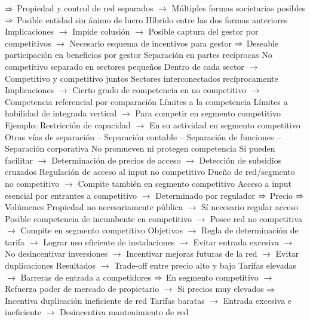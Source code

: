 \documentclass{nuevotema}
\begin{document}
\begin{esquemal}
				\4[] $\Rightarrow$ Propiedad y control de red separados
				\4[] $\to$ Múltiples formas societarias posibles
				\4[] $\Rightarrow$ Posible entidad sin ánimo de lucro
				\4[] Híbrido entre las dos formas anteriores
				\4[] Implicaciones
				\4[] $\to$ Impide colusión
				\4[] $\to$ Posible captura del gestor por competitivos
				\4[] $\to$ Necesario esquema de incentivos para gestor
				\4[] $\Rightarrow$ Deseable participación en beneficios por gestor
				\4 Separación en partes recíprocas
				\4[] No competitivo separado en sectores pequeños
				\4[] Dentro de cada sector
				\4[] $\to$ Competitivo y competitivo juntos
				\4[] Sectores interconectados recíprocamente
				\4[] Implicaciones
				\4[] $\to$ Cierto grado de competencia en no competitivo
				\4[] $\to$ Competencia referencial por comparación
				\4 Límites a la competencia
				\4[] Límites a habilidad de integrada vertical
				\4[] $\to$ Para competir en segmento competitivo
				\4 Ejemplo:
				\4[] Restricción de capacidad
				\4[] $\to$ En su actividad en segmento competitivo
				\4 Otras vías de separación
				\4[] -- Separación contable
				\4[] -- Separación de funciones
				\4[] -- Separación corporativa
				\4[] No promueven ni protegen competencia
				\4[] Sí pueden facilitar
				\4[] $\to$ Determinación de precios de acceso
				\4[] $\to$ Detección de subsidios cruzados
			\3 Regulación de acceso al input no competitivo
				\4 Dueño de red/segmento no competitivo
				\4[] $\to$ Compite también en segmento competitivo
				\4 Acceso a input esencial por entrantes a competitivo
				\4[] $\to$ Determinado por regulador
				\4[] $\Rightarrow$ Precio
				\4[] $\Rightarrow$ Volúmenes
				\4 Propiedad no necesariamente pública
				\4[] $\to$ Sí necesario regular acceso
				\4[] Posible competencia de incumbente en competitivo
				\4[] $\to$ Posee red no competitiva
				\4[] $\to$ Compite en segmento competitivo
				\4[] Objetivos
				\4[] $\to$ Regla de determinación de tarifa
				\4[] $\to$ Lograr uso eficiente de instalaciones
				\4[] $\to$ Evitar entrada excesiva
				\4[] $\to$ No desincentivar inversiones
				\4[] $\to$ Incentivar mejoras futuras de la red
				\4[] $\to$ Evitar duplicaciones
				\4[] Resultados
				\4[] $\to$ Trade-off entre precio alto y bajo
				\4[] Tarifas elevadas
				\4[] $\to$ Barreras de entrada a competidores
				\4[] $\Rightarrow$ En segmento competitivo
				\4[] $\to$ Refuerza poder de mercado de propietario
				\4[] $\to$ Si precios muy elevados
				\4[] $\Rightarrow$ Incentiva duplicación ineficiente de red
				\4[] Tarifas baratas
				\4[] $\to$ Entrada excesiva e ineficiente
				\4[] $\to$ Desincentiva mantenimiento de red

\end{esquemal}
\end{document}
